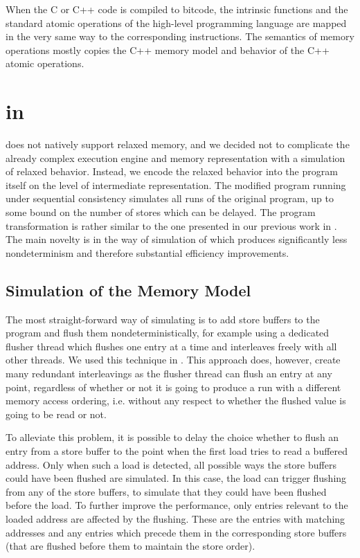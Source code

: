 When the C or C++ code is compiled to \llvm bitcode, the intrinsic functions and
the standard atomic operations of the high-level programming language are mapped
in the very same way to the corresponding \llvm instructions.
The semantics of \llvm memory operations mostly copies the C++ memory model and behavior
of the C++ atomic operations.



\section{\xtso in \divine} \label{sec:work}


\divine does not natively support relaxed memory, and we decided not to complicate the already complex execution engine and memory representation with a simulation of relaxed behavior.
Instead, we encode the relaxed behavior into the program itself on the level of \llvm intermediate representation.
The modified program running under sequential consistency simulates all \xtso runs of the original program, up to some bound on the number of stores which can be delayed.
The program transformation is rather similar to the one presented in our previous work in .
The main novelty is in the way of simulation of \xtso which produces significantly less nondeterminism and therefore substantial efficiency improvements.

\subsection{Simulation of the \xtso Memory Model}

The most straight-forward way of simulating \xtso is to add store buffers to the program and flush them nondeterministically, for example using a dedicated flusher thread which flushes one entry at a time and interleaves freely with all other threads.
We used this technique in .
This approach does, however, create many redundant interleavings as the flusher
thread can flush an entry at any point, regardless of whether or not it is going
to produce a run with a different memory access ordering, i.e. without any
respect to whether the flushed value is going to be read or not.

To alleviate this problem, it is possible to delay the choice whether to flush
an entry from a store buffer to the point when the first load tries to read a buffered address.
Only when such a load is detected, all possible ways the store buffers could have been flushed are simulated.
In this case, the load can trigger flushing from any of the store buffers, to simulate that they could have been flushed before the load.
To further improve the performance, only entries relevant to the loaded address
are affected by the flushing.
These are the entries with matching addresses and any entries which precede them in the corresponding store buffers (that are flushed before them to maintain the store order).

